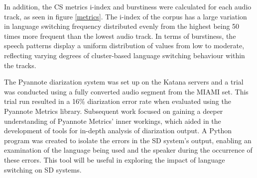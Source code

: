 \documentclass[11pt, a4paper]{report}
\begin{document}
\vspace*{10pt}
In addition, the CS metrics i-index and burstiness were calculated for each 
audio track, as seen in figure \ref*{metrics}. The i-index of the corpus 
has a large variation in language switching frequency distributed evenly from 
the highest being 50 times more frequent than the lowest audio track.  In terms 
of burstiness, the speech patterns display a uniform distribution of values 
from low to moderate, reflecting varying degrees of cluster-based language 
switching behaviour within the tracks. 

\vspace*{10pt}
The Pyannote diarization system was set up on the Katana servers and a 
trial was conducted using a fully converted audio segment from the MIAMI 
set. This trial run resulted in a 16\% diarization error rate when 
evaluated using the Pyannote Metrics library.
Subsequent work focused on gaining a deeper understanding of Pyannote Metrics' 
inner workings, which aided in the development of tools for in-depth 
analysis of diarization output. A Python program was created to isolate 
the errors in the SD system's output, enabling an examination of the 
language being used and the speaker during the occurrence of these errors. 
This tool will be useful in exploring the impact of language switching 
on SD systems.
\end{document}
